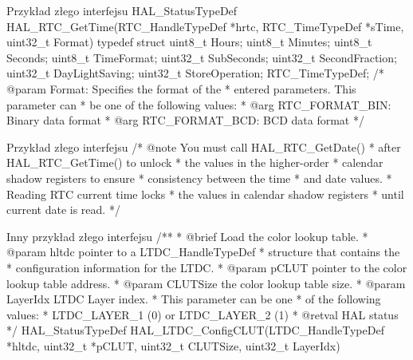 \documentclass{beamer}
\newenvironment{Snippet}{\Verbatim[samepage=true,fontsize=\footnotesize]}{\endVerbatim}
\begin{document}
\begin{frame}[fragile]{Przykład złego interfejsu}
  \begin{Snippet}
HAL_StatusTypeDef HAL_RTC_GetTime(RTC_HandleTypeDef *hrtc,
                                  RTC_TimeTypeDef *sTime,
                                  uint32_t Format)
  \end{Snippet}
  \pause
  \begin{Snippet}
typedef struct {
    uint8_t Hours;
    uint8_t Minutes;
    uint8_t Seconds;
    uint8_t TimeFormat;
    uint32_t SubSeconds;
    uint32_t SecondFraction;
    uint32_t DayLightSaving;
    uint32_t StoreOperation;
} RTC_TimeTypeDef;
  \end{Snippet}
  \pause
  \begin{Snippet}
/* @param  Format: Specifies the format of the 
 *         entered parameters. This parameter can
 *         be one of the following values:
 *            @arg RTC_FORMAT_BIN: Binary data format
 *            @arg RTC_FORMAT_BCD: BCD data format */
  \end{Snippet}
\end{frame}

\begin{frame}[fragile]{Przykład złego interfejsu}
  \begin{Snippet}
/* @note You must call HAL_RTC_GetDate()
 *        after HAL_RTC_GetTime() to unlock
 *        the values in the higher-order
 *        calendar shadow registers to ensure
 *        consistency between the time
 *        and date values.
 *        Reading RTC current time locks
 *        the values in calendar shadow registers
 *        until current date is read. */
  \end{Snippet}
\end{frame}

\begin{frame}[fragile]{Inny przykład złego interfejsu}
  \begin{Snippet}
/**
 * @brief  Load the color lookup table.
 * @param  hltdc    pointer to a LTDC_HandleTypeDef
 *                  structure that contains the
 *                  configuration information for the LTDC.
 * @param  pCLUT    pointer to the color lookup table address.
 * @param  CLUTSize the color lookup table size.
 * @param  LayerIdx LTDC Layer index.
 *                  This parameter can be one
 *                  of the following values:
 *                  LTDC_LAYER_1 (0) or LTDC_LAYER_2 (1)
 * @retval HAL status
 */
 HAL_StatusTypeDef
 HAL_LTDC_ConfigCLUT(LTDC_HandleTypeDef *hltdc,
                     uint32_t *pCLUT,
                     uint32_t CLUTSize,
                     uint32_t LayerIdx)
  \end{Snippet}
\end{frame}
\end{document}
